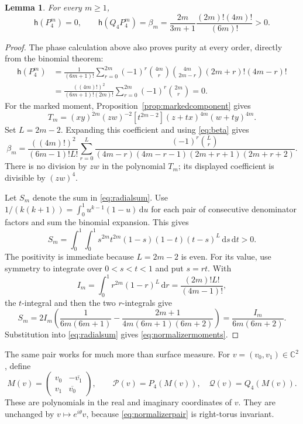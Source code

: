 \documentclass[11pt]{article}
\numberwithin{equation}{section}
\newtheorem{lemma}[theorem]{Lemma}
\theoremstyle{definition}
\theoremstyle{remark}
\newcommand{\C}{\mathbb C}
\newcommand{\dd}{\,\mathrm d}
\newcommand{\h}{\mathsf h}
\begin{document}
\begin{lemma}\label{lem:normalizerpositive}
For every $m\geq1$,
\begin{equation}\label{eq:normalizermoments}
 \h(P_4^m)=0,\qquad
 \h(Q_4P_4^m)=\beta_m
 =\frac{2m}{3m+1}\frac{(2m)!(4m)!}{(6m)!}>0.
\end{equation}
\end{lemma}
\begin{proof}
The phase calculation above also proves purity at every order, directly
from the binomial theorem:
\[
 \begin{aligned}
 \h(P_4^m)
 &=\frac1{(6m+1)!}\sum_{r=0}^{2m}(-1)^r
   \binom{4m}{r}\binom{4m}{2m-r}(2m+r)!(4m-r)!\\
 &=\frac{((4m)!)^2}{(6m+1)!(2m)!}
       \sum_{r=0}^{2m}(-1)^r\binom{2m}{r}=0.
 \end{aligned}
\]
For the marked moment, Proposition~\ref{prop:markedcomponent} gives
\[
 T_m=(xy)^{2m}(zw)^{-2}
       [t^{2m-2}](z+tx)^{4m}(w+ty)^{4m}.
\]
Set $L=2m-2$. Expanding this coefficient and using
\eqref{eq:beta} gives
\begin{equation}\label{eq:radialsum}
 \beta_m=\frac{((4m)!)^2}{(6m-1)!L!}
 \sum_{r=0}^L\frac{(-1)^r\binom Lr}
 {(4m-r)(4m-r-1)(2m+r+1)(2m+r+2)}.
\end{equation}
There is no division by $zw$ in the polynomial $T_m$; its displayed
coefficient is divisible by $(zw)^4$.

Let $S_m$ denote the sum in \eqref{eq:radialsum}. Use
$1/(k(k+1))=\int_0^1u^{k-1}(1-u)\dd u$ for each pair of consecutive
denominator factors and sum the binomial expansion. This gives
\[
 S_m=\int_0^1\!\int_0^1
     s^{2m}t^{2m}(1-s)(1-t)(t-s)^L\dd s\dd t>0.
\]
The positivity is immediate because $L=2m-2$ is even. For its value,
use symmetry to integrate over $0<s<t<1$ and put $s=rt$. With
\[
 I_m=\int_0^1r^{2m}(1-r)^L\dd r
     =\frac{(2m)!L!}{(4m-1)!},
\]
the $t$-integral and then the two $r$-integrals give
\[
 S_m=2I_m\left(\frac1{6m(6m+1)}
       -\frac{2m+1}{4m(6m+1)(6m+2)}\right)
     =\frac{I_m}{6m(6m+2)}.
\]
Substitution into \eqref{eq:radialsum} gives
\eqref{eq:normalizermoments}.
\end{proof}

The same pair works for much more than surface measure. For
$v=(v_0,v_1)\in\C^2$, define
\[
 M(v)=\begin{pmatrix}v_0&-\overline{v_1}\\v_1&\overline{v_0}\end{pmatrix},
 \qquad \mathcal P(v)=P_4(M(v)),\quad
 \mathcal Q(v)=Q_4(M(v)).
\]
These are polynomials in the real and imaginary coordinates of $v$.
They are unchanged by $v\mapsto e^{i\theta}v$, because
\eqref{eq:normalizerpair} is right-torus invariant.
\end{document}
